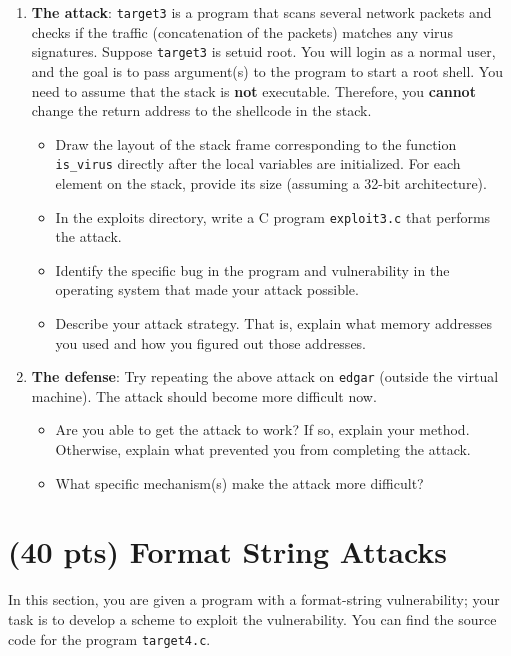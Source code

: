 \documentclass[11pt]{article}
\begin{document}
\begin{enumerate}
	\item \textbf{The attack}: \verb"target3" is a program that scans several network packets and checks if the traffic (concatenation of the packets) matches any virus signatures. Suppose \verb"target3" is setuid root. You will login as a normal user, and the goal is to pass argument(s) to the program to start a root shell. You need to assume that the stack is \textbf{not} executable. Therefore, you \textbf{cannot} change the return address to the shellcode in the stack.
	
	\begin{itemize}
		\item Draw the layout of the stack frame corresponding to the function \verb"is_virus" directly after the local variables are initialized. For each element on the stack, provide its size (assuming a 32-bit architecture).
		\item In the exploits directory, write a C program \verb"exploit3.c" that performs the attack.
		\item Identify the specific bug in the program and vulnerability in the operating system that made your attack possible.
		\item Describe your attack strategy. That is, explain what memory addresses you used and how you figured out those addresses.
	\end{itemize}
	
	\item \textbf{The defense}: Try repeating the above attack on \verb"edgar" (outside the virtual machine). The attack should become more difficult now.
	\begin{itemize}
		\item Are you able to get the attack to work? If so, explain your method. Otherwise, explain what prevented you from completing the attack.
		\item What specific mechanism(s) make the attack more difficult?
	\end{itemize}
\end{enumerate}

\section{(40 pts) Format String Attacks}

In this section, you are given a program with a format-string vulnerability; your task is to develop a scheme to exploit the vulnerability. You can find the source code for the program \verb"target4.c".
\end{document}
